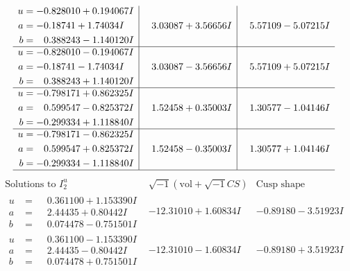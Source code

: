 \documentclass[1p]{elsarticle_modified}
\theoremstyle{definition}
\newcommand{\I}{\sqrt{-1}}
\begin{document}
$$\begin{array}{c|c|c}
\begin{aligned}
u &= -0.828010 + 0.194067 I \\
a &= -0.18741 + 1.74034 I \\
b &= \phantom{-}0.388243 - 1.140120 I\end{aligned}
 & \phantom{-}3.03087 + 3.56656 I & \phantom{-}5.57109 - 5.07215 I \\ \hline\begin{aligned}
u &= -0.828010 - 0.194067 I \\
a &= -0.18741 - 1.74034 I \\
b &= \phantom{-}0.388243 + 1.140120 I\end{aligned}
 & \phantom{-}3.03087 - 3.56656 I & \phantom{-}5.57109 + 5.07215 I \\ \hline\begin{aligned}
u &= -0.798171 + 0.862325 I \\
a &= \phantom{-}0.599547 - 0.825372 I \\
b &= -0.299334 + 1.118840 I\end{aligned}
 & \phantom{-}1.52458 + 0.35003 I & \phantom{-}1.30577 - 1.04146 I \\ \hline\begin{aligned}
u &= -0.798171 - 0.862325 I \\
a &= \phantom{-}0.599547 + 0.825372 I \\
b &= -0.299334 - 1.118840 I\end{aligned}
 & \phantom{-}1.52458 - 0.35003 I & \phantom{-}1.30577 + 1.04146 I\\
 \hline 
 \end{array}$$\newpage$$\begin{array}{c|c|c}  
\text{Solutions to }I^u_{2}& \I (\text{vol} + \sqrt{-1}CS) & \text{Cusp shape}\\
 \hline 
\begin{aligned}
u &= \phantom{-}0.361100 + 1.153390 I \\
a &= \phantom{-}2.44435 + 0.80442 I \\
b &= \phantom{-}0.074478 - 0.751501 I\end{aligned}
 & -12.31010 + 1.60834 I & -0.89180 - 3.51923 I \\ \hline\begin{aligned}
u &= \phantom{-}0.361100 - 1.153390 I \\
a &= \phantom{-}2.44435 - 0.80442 I \\
b &= \phantom{-}0.074478 + 0.751501 I\end{aligned}
 & -12.31010 - 1.60834 I & -0.89180 + 3.51923 I \\ \hline\begin{aligned}

\end{aligned}
\end{array}$$
\end{document}
